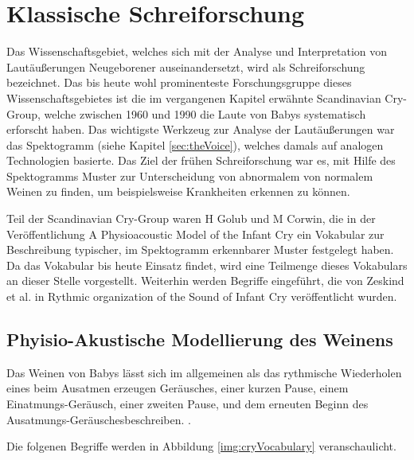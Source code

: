 \section{Klassische Schreiforschung}

Das Wissenschaftsgebiet, welches sich mit der Analyse und Interpretation von Lautäußerungen Neugeborener auseinandersetzt, wird als \glqq Schreiforschung\grqq{} bezeichnet. Das bis heute wohl prominenteste Forschungsgruppe dieses Wissenschaftsgebietes ist die im vergangenen Kapitel erwähnte \glqq Scandinavian Cry-Group\grqq \cite{crygroup}, welche zwischen 1960 und 1990 die Laute von Babys systematisch erforscht haben. Das wichtigste Werkzeug zur Analyse der Lautäußerungen war das Spektogramm (siehe Kapitel \ref{sec:theVoice}), welches damals auf analogen Technologien basierte. Das Ziel der frühen Schreiforschung war es, mit Hilfe des Spektogramms Muster zur Unterscheidung von abnormalem von normalem Weinen zu finden, um beispielsweise Krankheiten erkennen zu können.\cite[S. 142]{signal} 

Teil der Scandinavian Cry-Group waren H Golub und M Corwin, die in der Veröffentlichung \glqq A Physioacoustic Model of the Infant Cry\grqq \cite{cryModel} ein Vokabular zur Beschreibung typischer, im Spektogramm erkennbarer Muster festgelegt haben. Da das Vokabular bis heute Einsatz findet, wird eine Teilmenge dieses Vokabulars an dieser Stelle vorgestellt. Weiterhin werden Begriffe eingeführt, die von Zeskind et al. in \glqq Rythmic organization of the Sound of Infant Cry \grqq{} veröffentlicht wurden.\cite{rythmic}

\subsection{Phyisio-Akustische Modellierung des Weinens}
\label{sec:acousticModel}

Das Weinen von Babys lässt sich im allgemeinen als das \glqq rythmische Wiederholen eines beim Ausatmen erzeugen Geräusches, einer kurzen Pause, einem Einatmungs-Geräusch, einer zweiten Pause, und dem erneuten Beginn des Ausatmungs-Geräusches\grqq beschreiben. \cite{wolff}.

Die folgenen Begriffe werden in Abbildung \ref{img:cryVocabulary} veranschaulicht.

